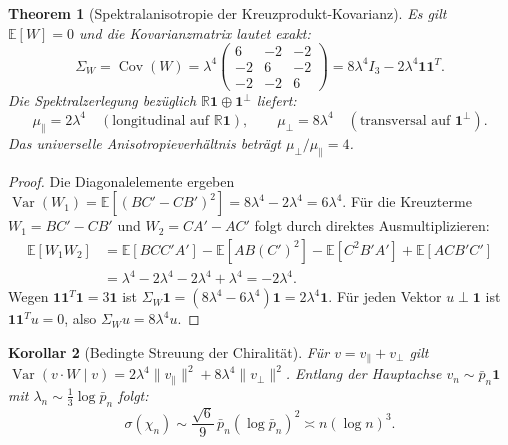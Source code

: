 \documentclass[11pt,a4paper]{article}
\theoremstyle{plain}
\newtheorem{theorem}{Theorem}[section]
\newtheorem{corollary}[theorem]{Korollar}
\theoremstyle{definition}
\theoremstyle{remark}
\begin{document}
\begin{theorem}[Spektralanisotropie der Kreuzprodukt-Kovarianz]
Es gilt $\mathbb{E}[W] = 0$ und die Kovarianzmatrix lautet exakt:
\begin{equation}
\Sigma_W = \operatorname{Cov}(W) = \lambda^4 \begin{pmatrix} 6 & -2 & -2 \\ -2 & 6 & -2 \\ -2 & -2 & 6 \end{pmatrix} = 8\lambda^4 I_3 - 2\lambda^4 \mathbf{1}\mathbf{1}^T.
\end{equation}
Die Spektralzerlegung bezüglich $\mathbb{R}\mathbf{1} \oplus \mathbf{1}^\perp$ liefert:
\begin{equation}
\mu_\parallel = 2\lambda^4 \quad (\text{longitudinal auf } \mathbb{R}\mathbf{1}), \qquad \mu_\perp = 8\lambda^4 \quad (\text{transversal auf } \mathbf{1}^\perp).
\end{equation}
Das universelle Anisotropieverhältnis beträgt $\mu_\perp / \mu_\parallel = 4$.
\end{theorem}
\begin{proof}
Die Diagonalelemente ergeben $\operatorname{Var}(W_1) = \mathbb{E}[(BC' - CB')^2] = 8\lambda^4 - 2\lambda^4 = 6\lambda^4$. Für die Kreuzterme $W_1 = BC' - CB'$ und $W_2 = CA' - AC'$ folgt durch direktes Ausmultiplizieren:
\begin{align*}
\mathbb{E}[W_1 W_2] &= \mathbb{E}[B C C' A'] - \mathbb{E}[A B (C')^2] - \mathbb{E}[C^2 B' A'] + \mathbb{E}[A C B' C'] \\
&= \lambda^4 - 2\lambda^4 - 2\lambda^4 + \lambda^4 = -2\lambda^4.
\end{align*}
Wegen $\mathbf{1}\mathbf{1}^T \mathbf{1} = 3\mathbf{1}$ ist $\Sigma_W \mathbf{1} = (8\lambda^4 - 6\lambda^4)\mathbf{1} = 2\lambda^4 \mathbf{1}$. Für jeden Vektor $u \perp \mathbf{1}$ ist $\mathbf{1}\mathbf{1}^T u = 0$, also $\Sigma_W u = 8\lambda^4 u$.
\end{proof}

\begin{corollary}[Bedingte Streuung der Chiralität]
Für $v = v_\parallel + v_\perp$ gilt $\operatorname{Var}(v \cdot W \mid v) = 2\lambda^4 \|v_\parallel\|^2 + 8\lambda^4 \|v_\perp\|^2$. Entlang der Hauptachse $v_n \sim \bar{p}_n \mathbf{1}$ mit $\lambda_n \sim \frac{1}{3}\log \bar{p}_n$ folgt:
\begin{equation}
\sigma(\chi_n) \sim \frac{\sqrt{6}}{9} \, \bar{p}_n (\log \bar{p}_n)^2 \asymp n (\log n)^3.
\end{equation}
\end{corollary}
\end{document}
